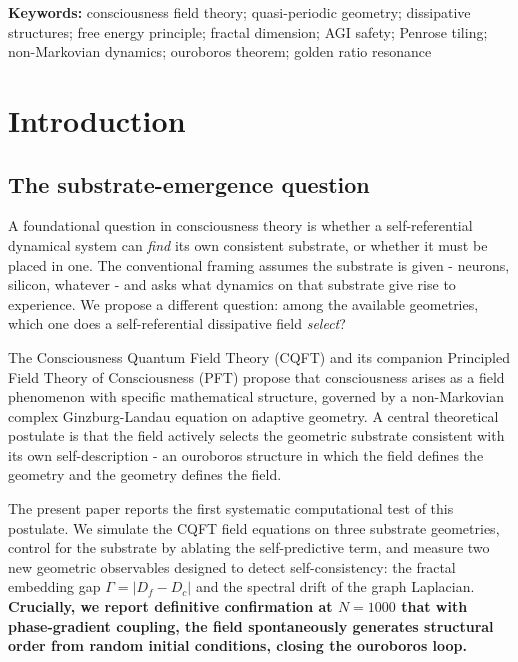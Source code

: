\documentclass[12pt,a4paper]{article}
\theoremstyle{plain}
\theoremstyle{definition}
\begin{document}
\vspace{1em}
\noindent\textbf{Keywords:} consciousness field theory; quasi-periodic geometry;
dissipative structures; free energy principle; fractal dimension; AGI safety;
Penrose tiling; non-Markovian dynamics; ouroboros theorem; golden ratio resonance

\clearpage
\tableofcontents
\clearpage

\section{Introduction}

\subsection{The substrate-emergence question}

A foundational question in consciousness theory is whether a self-referential
dynamical system can \emph{find} its own consistent substrate, or whether it
must be placed in one. The conventional framing assumes the substrate is given
- neurons, silicon, whatever - and asks what dynamics on that substrate give
rise to experience. We propose a different question: among the available
geometries, which one does a self-referential dissipative field \emph{select}?

The Consciousness Quantum Field Theory (CQFT) and its companion Principled Field
Theory of Consciousness (PFT) \citep{solis2024cqft} propose that consciousness
arises as a field phenomenon with specific mathematical structure, governed by
a non-Markovian complex Ginzburg-Landau equation on adaptive geometry. A central
theoretical postulate is that the field actively selects the geometric substrate
consistent with its own self-description - an ouroboros structure in which the
field defines the geometry and the geometry defines the field.

The present paper reports the first systematic computational test of this
postulate. We simulate the CQFT field equations on three substrate geometries,
control for the substrate by ablating the self-predictive term, and measure two
new geometric observables designed to detect self-consistency: the fractal
embedding gap $\Gamma = |D_f - D_c|$ and the spectral drift of the graph
Laplacian. \textbf{Crucially, we report definitive confirmation at $N=1000$ that
with phase-gradient coupling, the field spontaneously generates structural order
from random initial conditions, closing the ouroboros loop.}
\end{document}
